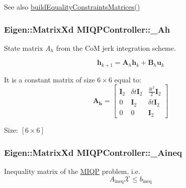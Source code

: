 \begin{DoxySeeAlso}{\-See also}
\hyperlink{classMIQPController_a870c7d3c0e5fcfd46f7bb95924007082}{build\-Equality\-Constraints\-Matrices()} 
\end{DoxySeeAlso}
\hypertarget{classMIQPController_a388ed1c232c212e171276993b5cb3fec}{
\subsubsection[{\-\_\-\-Ah}]{\setlength{\rightskip}{0pt plus 5cm}\-Eigen\-::\-Matrix\-Xd {\bf \-M\-I\-Q\-P\-Controller\-::\-\_\-\-Ah}}}\label{classMIQPController_a388ed1c232c212e171276993b5cb3fec}
\-State matrix $A_h$ from the \-Co\-M jerk integration scheme.

\[ \mathbf{h}_{k+1} = \mathbf{A}_h \mathbf{h}_k + \mathbf{B}_h \mathbf{u}_k \]

\-It is a constant matrix of size $6\times6$ equal to\-: \[ \mathbf{A_h} = \left[ \begin{array}{ccc} \mathbf{I}_2 & \delta t \mathbf{I}_2 & \frac{\delta t^2}{2} \mathbf{I}_2 \\ 0 & \mathbf{I}_2 & \delta t \mathbf{I}_2 \\ 0 & 0 & \mathbf{I}_2 \end{array} \right] \]

\-Size\-: $[6\times6]$ \hypertarget{classMIQPController_a7678fd8e1c08986d7ae0dc1a884040e1}{
\subsubsection[{\-\_\-\-Aineq}]{\setlength{\rightskip}{0pt plus 5cm}\-Eigen\-::\-Matrix\-Xd {\bf \-M\-I\-Q\-P\-Controller\-::\-\_\-\-Aineq}}}\label{classMIQPController_a7678fd8e1c08986d7ae0dc1a884040e1}
\-Inequality matrix of the \hyperlink{namespaceMIQP}{\-M\-I\-Q\-P} problem, i.\-e. \[ A_{\text{ineq}} \mathcal{X} \leq b_{\text{ineq}} \]

